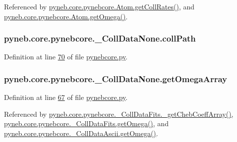 Referenced by \hyperlink{pynebcore_8py_source_l01329}{pyneb.\+core.\+pynebcore.\+Atom.\+get\+Coll\+Rates()}, and \hyperlink{pynebcore_8py_source_l01262}{pyneb.\+core.\+pynebcore.\+Atom.\+get\+Omega()}.

\hypertarget{classpyneb_1_1core_1_1pynebcore_1_1___coll_data_none_a3e39b0e757b0987e39ad0257a981ff13}{}
\subsubsection[{coll\+Path}]{\setlength{\rightskip}{0pt plus 5cm}pyneb.\+core.\+pynebcore.\+\_\+\+Coll\+Data\+None.\+coll\+Path}\label{classpyneb_1_1core_1_1pynebcore_1_1___coll_data_none_a3e39b0e757b0987e39ad0257a981ff13}


Definition at line \hyperlink{pynebcore_8py_source_l00070}{70} of file \hyperlink{pynebcore_8py_source}{pynebcore.\+py}.

\hypertarget{classpyneb_1_1core_1_1pynebcore_1_1___coll_data_none_a9945656d527d539b02443f1e12175952}{}
\subsubsection[{get\+Omega\+Array}]{\setlength{\rightskip}{0pt plus 5cm}pyneb.\+core.\+pynebcore.\+\_\+\+Coll\+Data\+None.\+get\+Omega\+Array}\label{classpyneb_1_1core_1_1pynebcore_1_1___coll_data_none_a9945656d527d539b02443f1e12175952}


Definition at line \hyperlink{pynebcore_8py_source_l00067}{67} of file \hyperlink{pynebcore_8py_source}{pynebcore.\+py}.



Referenced by \hyperlink{pynebcore_8py_source_l00734}{pyneb.\+core.\+pynebcore.\+\_\+\+Coll\+Data\+Fits.\+\_\+get\+Cheb\+Coeff\+Array()}, \hyperlink{pynebcore_8py_source_l00811}{pyneb.\+core.\+pynebcore.\+\_\+\+Coll\+Data\+Fits.\+get\+Omega()}, and \hyperlink{pynebcore_8py_source_l01063}{pyneb.\+core.\+pynebcore.\+\_\+\+Coll\+Data\+Ascii.\+get\+Omega()}.

